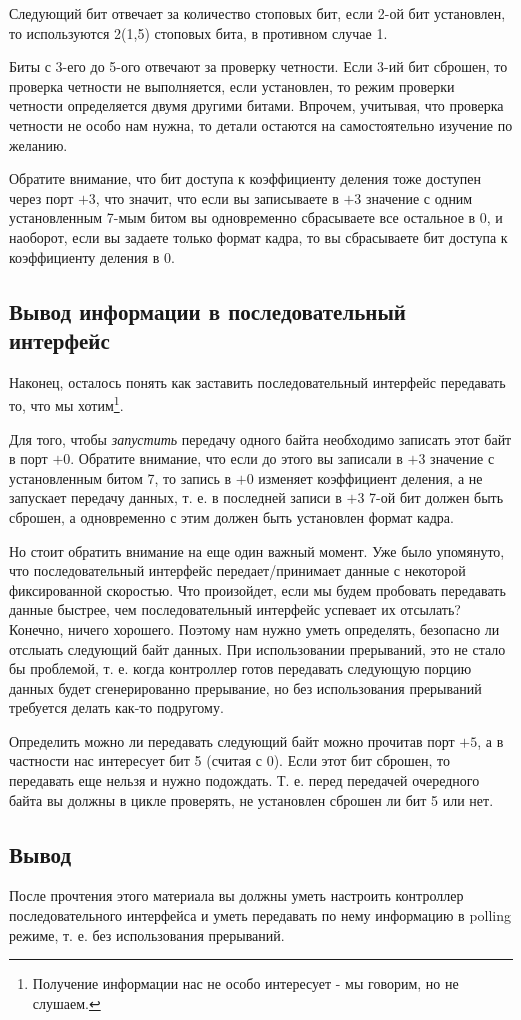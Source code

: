 Следующий бит отвечает за количество стоповых бит, если 2-ой бит установлен, то
используются 2(1,5) стоповых бита, в противном случае 1.

Биты с 3-его до 5-ого отвечают за проверку четности. Если 3-ий бит сброшен, то
проверка четности не выполняется, если установлен, то режим проверки четности
определяется двумя другими битами. Впрочем, учитывая, что проверка четности
не особо нам нужна, то детали остаются на самостоятельно изучение по желанию.

Обратите внимание, что бит доступа к коэффициенту деления тоже доступен через
порт $+3$, что значит, что если вы записываете в $+3$ значение с одним
установленным 7-мым битом вы одновременно сбрасываете все остальное в 0, и
наоборот, если вы задаете только формат кадра, то вы сбрасываете бит доступа
к коэффициенту деления в 0.

\subsection{Вывод информации в последовательный интерфейс}

Наконец, осталось понять как заставить последовательный интерфейс передавать то,
что мы хотим\footnote{Получение информации нас не особо интересует - мы говорим,
но не слушаем.}.

Для того, чтобы \emph{запустить} передачу одного байта необходимо записать этот
байт в порт $+0$. Обратите внимание, что если до этого вы записали в $+3$
значение с установленным битом 7, то запись в $+0$ изменяет коэффициент деления,
а не запускает передачу данных, т. е. в последней записи в $+3$ 7-ой бит должен
быть сброшен, а одновременно с этим должен быть установлен формат кадра.

Но стоит обратить внимание на еще один важный момент. Уже было упомянуто, что
последовательный интерфейс передает/принимает данные с некоторой фиксированной
скоростью. Что произойдет, если мы будем пробовать передавать данные быстрее,
чем последовательный интерфейс успевает их отсылать? Конечно, ничего хорошего.
Поэтому нам нужно уметь определять, безопасно ли отслыать следующий байт данных.
При использовании прерываний, это не стало бы проблемой, т. е. когда контроллер
готов передавать следующую порцию данных будет сгенерированно прерывание, но
без использования прерываний требуется делать как-то подругому.

Определить можно ли передавать следующий байт можно прочитав порт $+5$, а в
частности нас интересует бит 5 (считая с 0). Если этот бит сброшен, то
передавать еще нельзя и нужно подождать. Т. е. перед передачей очередного байта
вы должны в цикле проверять, не установлен сброшен ли бит 5 или нет.

\subsection{Вывод}

После прочтения этого материала вы должны уметь настроить контроллер
последовательного интерфейса и уметь передавать по нему информацию в
polling режиме, т. е. без использования прерываний.
